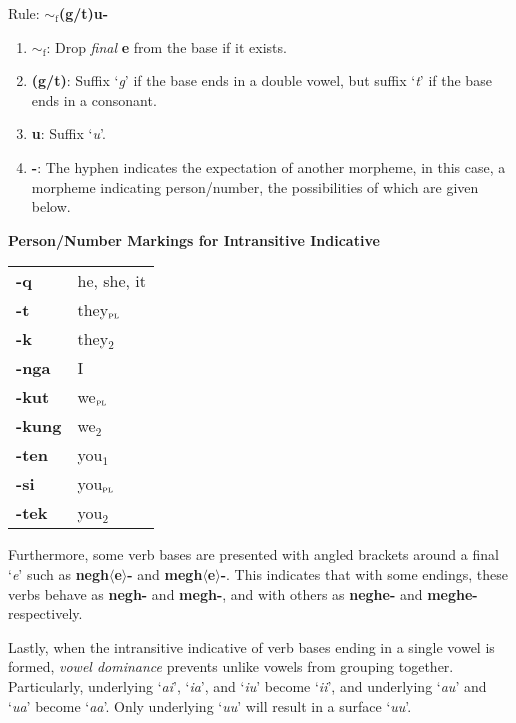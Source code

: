 \documentclass{article}
\begin{document}
\noindent Rule: \textbf{${\sim}_\text{f}$(g/t)u-}

\begin{enumerate}
\item \textbf{${\sim}_\text{f}$}: Drop \textit{final} \textbf{e} from the base if it exists.
\item \textbf{(g/t)}: Suffix `\textit{g}' if the base ends in a double vowel, but suffix `\textit{t}' if the base ends in a consonant.
\item \textbf{u}: Suffix `\textit{u}'.
\item \textbf{-}: The hyphen indicates the expectation of another morpheme, in this case, a morpheme indicating person/number, the possibilities of which are given below.
\end{enumerate}

\textbf{Person/Number Markings for Intransitive Indicative}

\begin{tabular}{ l l }
\textbf{-q} & he, she, it \\ 
\textbf{-t} & they$_\text{\textsc{pl}}$ \\  
\textbf{-k} & they$_\text{2}$ \\
\textbf{-nga} & I \\
\textbf{-kut} & we$_\text{\textsc{pl}}$ \\  
\textbf{-kung} & we$_\text{2}$ \\  
\textbf{-ten} & you$_\text{1}$ \\
\textbf{-si} & you$_\text{\textsc{pl}}$ \\
\textbf{-tek} & you$_\text{2}$
\end{tabular}

\vspace{12pt}

Furthermore, some verb bases are presented with angled brackets around a final `\textit{e}' such as \textbf{negh$\langle$e$\rangle$-} and \textbf{megh$\langle$e$\rangle$-}.
%
This indicates that with some endings, these verbs behave as \textbf{negh-} and \textbf{megh-}, and with others as \textbf{neghe-} and \textbf{meghe-} respectively.

Lastly, when the intransitive indicative of verb bases ending in a single vowel is formed, \textit{vowel dominance} prevents unlike vowels from grouping together.
%
Particularly, underlying `\textit{ai}', `\textit{ia}', and `\textit{iu}' become `\textit{ii}', and underlying `\textit{au}' and `\textit{ua}' become `\textit{aa}'.
%
Only underlying `\textit{uu}' will result in a surface `\textit{uu}'.
\end{document}
